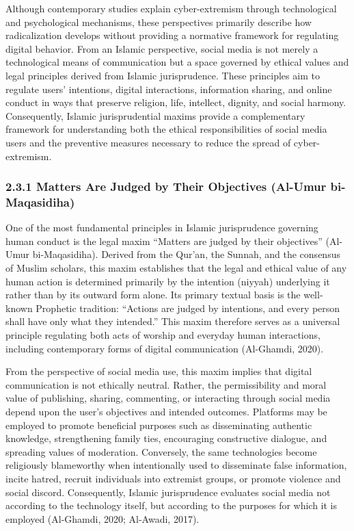 \documentclass[10pt]{NSP1}
\begin{document}
	Although contemporary studies explain cyber-extremism through technological and psychological mechanisms, these perspectives primarily describe how radicalization develops without providing a normative framework for regulating digital behavior. From an Islamic perspective, social media is not merely a technological means of communication but a space governed by ethical values and legal principles derived from Islamic jurisprudence. These principles aim to regulate users' intentions, digital interactions, information sharing, and online conduct in ways that preserve religion, life, intellect, dignity, and social harmony. Consequently, Islamic jurisprudential maxims provide a complementary framework for understanding both the ethical responsibilities of social media users and the preventive measures necessary to reduce the spread of cyber-extremism.
	
	\subsubsection*{2.3.1 Matters Are Judged by Their Objectives (Al-Umur bi-Maqasidiha)}
	
	One of the most fundamental principles in Islamic jurisprudence governing human conduct is the legal maxim ``Matters are judged by their objectives'' (Al-Umur bi-Maqasidiha). Derived from the Qur'an, the Sunnah, and the consensus of Muslim scholars, this maxim establishes that the legal and ethical value of any human action is determined primarily by the intention (niyyah) underlying it rather than by its outward form alone. Its primary textual basis is the well-known Prophetic tradition: ``Actions are judged by intentions, and every person shall have only what they intended.'' This maxim therefore serves as a universal principle regulating both acts of worship and everyday human interactions, including contemporary forms of digital communication (Al-Ghamdi, 2020).
	
	From the perspective of social media use, this maxim implies that digital communication is not ethically neutral. Rather, the permissibility and moral value of publishing, sharing, commenting, or interacting through social media depend upon the user's objectives and intended outcomes. Platforms may be employed to promote beneficial purposes such as disseminating authentic knowledge, strengthening family ties, encouraging constructive dialogue, and spreading values of moderation. Conversely, the same technologies become religiously blameworthy when intentionally used to disseminate false information, incite hatred, recruit individuals into extremist groups, or promote violence and social discord. Consequently, Islamic jurisprudence evaluates social media not according to the technology itself, but according to the purposes for which it is employed (Al-Ghamdi, 2020; Al-Awadi, 2017).
	
\end{document}
